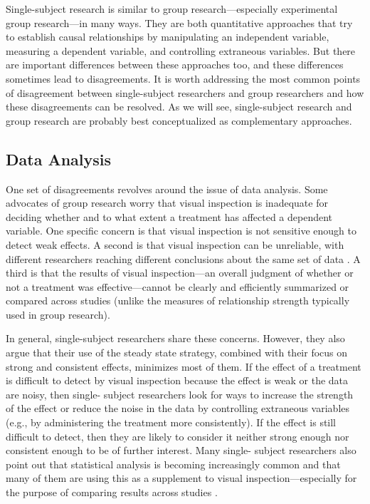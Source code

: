  Single-subject research is similar to group research---especially experimental group research---in many ways. They are both quantitative approaches that try to establish causal relationships by manipulating an independent variable, measuring a dependent variable, and controlling extraneous variables. But there are important differences between these approaches too, and these differences sometimes lead to disagreements. It is worth addressing the most common points of disagreement between single-subject researchers and group researchers and how these disagreements can be resolved. As we will see, single-subject research and group research are probably best conceptualized as complementary approaches.

 \subsection{Data Analysis}

 One set of disagreements revolves around the issue of data analysis. Some advocates of group research worry that visual inspection is inadequate for deciding whether and to what extent a treatment has affected a dependent variable. One specific concern is that visual inspection is not sensitive enough to detect weak effects. A second is that visual inspection can be unreliable, with different researchers reaching different conclusions about the same set of data \citep{danov_survey_2008}. A third is that the results of visual inspection---an overall judgment of whether or not a treatment was effective---cannot be clearly and efficiently summarized or compared across studies (unlike the measures of relationship strength typically used in group research).

 In general, single-subject researchers share these concerns. However, they also argue that their use of the steady state strategy, combined with their focus on strong and consistent effects, minimizes most of them. If the effect of a treatment is difficult to detect by visual inspection because the effect is weak or the data are noisy, then single- subject researchers look for ways to increase the strength of the effect or reduce the noise in the data by controlling extraneous variables (e.g., by administering the treatment more consistently). If the effect is still difficult to detect, then they are likely to consider it neither strong enough nor consistent enough to be of further interest. Many single- subject researchers also point out that statistical analysis is becoming increasingly common and that many of them are using this as a supplement to visual inspection---especially for the purpose of comparing results across studies \citep{scruggs_how_2001}.

